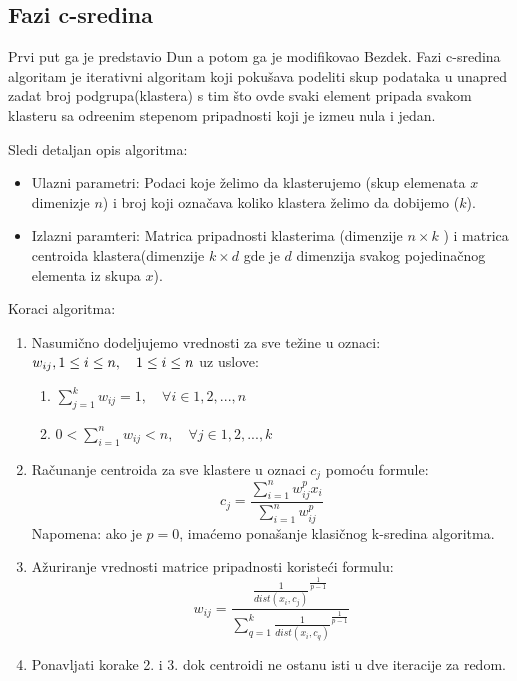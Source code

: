 \documentclass{article}
\begin{document}
\subsection{\selectfont Fazi c-sredina}

Prvi put ga je predstavio Dun a potom ga je modifikovao Bezdek. Fazi c-sredina algoritam je iterativni algoritam koji poku\v{s}ava podeliti skup podataka u unapred zadat broj podgrupa(klastera) s tim \v{s}to ovde svaki element pripada svakom klasteru sa odre\dj enim stepenom pripadnosti koji je izme\dj u nula i jedan.

Sledi detaljan opis algoritma:

\begin{itemize}

\item Ulazni parametri: Podaci koje \v{z}elimo da klasterujemo (skup elemenata $x$ dimenizje $n$) i broj koji ozna\v{c}ava koliko klastera \v{z}elimo da dobijemo ($k$).
\item Izlazni paramteri: Matrica pripadnosti klasterima (dimenzije $n \times k$ ) i matrica centroida klastera(dimenzije $k \times d$ gde je $d$ dimenzija svakog pojedina\v{c}nog elementa iz skupa $x$).

\end{itemize}

Koraci algoritma:

\begin{enumerate}

\item Nasumi\v{c}no dodeljujemo vrednosti za sve te\v{z}ine u oznaci: $w_{ij}, \\ 1\leq i \leq n, \quad 1\leq i \leq n$ uz uslove:
\begin{enumerate}
\item $ \sum_{j=1}^k w_{ij} = 1, \quad \forall i\in {1,2,...,n}$
\item $ 0 < \sum_{i=1}^n w_{ij} < n, \quad \forall j\in {1,2,...,k} $
\end{enumerate}
\item Ra\v{c}unanje centroida za sve klastere u oznaci $c_j$ pomo\'{c}u formule:
\begin{equation}
c_j = \frac{\sum_{i=1}^n w_{ij}^p x_i}{\sum_{i=1}^n w_{ij}^p}
\end{equation}
Napomena: ako je $p = 0$, ima\'{c}emo pona\v{s}anje klasi\v{c}nog k-sredina algoritma.
\item A\v{z}uriranje vrednosti matrice pripadnosti koriste\'{c}i formulu:
\begin{equation}
w_{ij} = \frac{\frac{1}{dist(x_i, c_j)}^\frac{1}{p-1}}{\sum_{q=1}^k \frac{1}{dist(x_i, c_q)}^\frac{1}{p-1}}
\end{equation}
\item Ponavljati korake 2. i 3. dok centroidi ne ostanu isti u dve iteracije za redom.

\end{enumerate}
\end{document}
